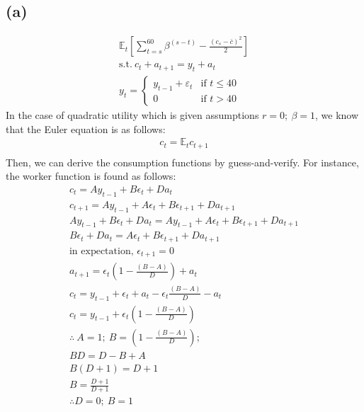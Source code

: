 \documentclass[10pt,a4paper]{article}
\newcommand{\sumtb}{\sum\limits_{t=s}^{60}}
\begin{document}
    \subsection*{(a)}
        \begin{gather*}
            \mathbb{E}_t[\sumtb\beta^{(s-t)} -\frac{(c_s-\bar{c})^2}{2}] \\
            \text{s.t.} \ c_t + a_{t+1} = y_t + a_t \\
            y_t = \begin{cases} 
            y_{t-1} + \varepsilon_t & \text{if } t \leq 40 \\
            0 & \text{if } t > 40 
            \end{cases}
        \end{gather*}
        In the case of quadratic utility which is given assumptions $r=0; \ \beta=1$, we know that the
        Euler equation is as follows:
        \begin{gather*}
            c_t = \mathbb{E}_tc_{t+1} \\
        \end{gather*}
        Then, we can derive the consumption functions by guess-and-verify. For instance, the worker
        function is found as follows:
        \begin{gather*}
            c_t = Ay_{t-1} + B\epsilon_t + Da_t \\
            c_{t+1} = Ay_{t-1} + A\epsilon_t + B\epsilon_{t+1} + Da_{t+1} \\
            Ay_{t-1} + B\epsilon_t + Da_t = Ay_{t-1} + A\epsilon_t + B\epsilon_{t+1} + Da_{t+1} \\
            B\epsilon_t + Da_t = A\epsilon_t + B\epsilon_{t+1} + Da_{t+1} \\
            \text{in expectation, $\epsilon_{t+1} = 0$} \\
            a_{t+1} = \epsilon_t(1-\frac{(B-A)}{D}) + a_t \\
            c_t = y_{t-1} + \epsilon_t + a_t - \epsilon_t\frac{(B-A)}{D} - a_t \\
            c_t = y_{t-1} + \epsilon_t(1-\frac{(B-A)}{D}) \\
            \therefore \ A = 1; \ B = (1-\frac{(B-A)}{D});  \\
            BD = D - B + A \\
            B(D + 1) = D + 1 \\
            B = \frac{D+1}{D+1} \\
            \therefore D = 0; \ B = 1
        \end{gather*}
\end{document}
